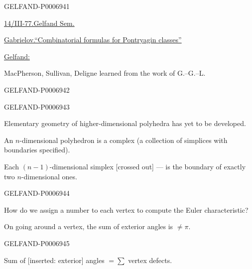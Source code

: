 \begin{GelfandAdjacentEvidence}{GELFAND-P000694}{1}

\underline{14/III-77.}\qquad\underline{Gelfand Sem.}

\underline{Gabrielov.}\qquad\underline{“Combinatorial formulas for Pontryagin classes”}

\underline{Gelfand:}

MacPherson, Sullivan, Deligne learned from the work of G.–G.–L.
\end{GelfandAdjacentEvidence}
\begin{GelfandAdjacentEvidence}{GELFAND-P000694}{2}

\end{GelfandAdjacentEvidence}
\begin{GelfandAdjacentEvidence}{GELFAND-P000694}{3}


Elementary geometry of higher-dimensional polyhedra has yet to be developed.

An \(n\)-dimensional polyhedron is a complex (a collection of simplices with boundaries specified).

Each \((n-1)\)-dimensional simplex [crossed out] --- is the boundary of exactly two \(n\)-dimensional ones.
\end{GelfandAdjacentEvidence}
\begin{GelfandAdjacentEvidence}{GELFAND-P000694}{4}


How do we assign a number to each vertex to compute the Euler characteristic?

On going around a vertex, the sum of exterior angles is \(\ne\pi\).
\end{GelfandAdjacentEvidence}
\begin{GelfandAdjacentEvidence}{GELFAND-P000694}{5}

Sum of [inserted: exterior] angles \(=\sum\) vertex defects.
\end{GelfandAdjacentEvidence}
